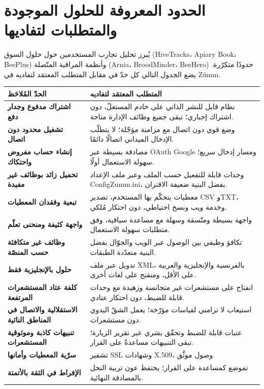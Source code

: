 \section{الحدود المعروفة للحلول الموجودة والمتطلبات لتفاديها}
يُبرز تحليل تجارب المستخدمين حول حلول السوق (\textenglish{HiveTracks}،
\textenglish{Apiary Book}، \textenglish{BeePlus}) وأنظمة المراقبة المتّصلة
(\textenglish{Arnia}، \textenglish{BroodMinder}، \textenglish{BeeHero}) حدودًا
متكرّرة. يضع الجدول التالي كل حدّ في مقابل المتطلب المعتمَد لتفاديه في Zümm.
\begin{xltabular}{\textwidth}{>{\bfseries}p{5.2cm} X}
\toprule
\textbf{الحدّ المُلاحَظ} & \textbf{المتطلب المعتمَد لتفاديه} \\
\midrule
\endhead
اشتراك مدفوع وجدار دفع & نظام قابل للنشر الذاتي على خادم المستغلّ، دون اشتراك إجباري؛ تبقى جميع وظائف الإدارة متاحة. \\
تشغيل محدود دون اتصال & وضع قوي دون اتصال مع مزامنة مؤجّلة؛ لا يتطلّب الإدخال الميداني اتصالًا دائمًا. \\
إنشاء حساب مفروض واحتكاك & مصادقة بسيطة عبر OAuth Google ومسار إدخال سريع؛ سهولة الاستعمال أولًا. \\
تحميل زائد بوظائف غير مفيدة & وحدات قابلة للتفعيل حسب الملف وعبر ملف الإعداد ConfigZumm.ini، بفضل البنية ضعيفة الاقتران. \\
تبعية وفقدان المعطيات & معطيات يتحكّم بها المستخدم، تصدير CSV وTXT، وخدمة ويب ونسخ احتياطي، دون احتكار مُلكي. \\
واجهة كثيفة ومنحنى تعلّم & واجهة بسيطة ومتّسقة وسهلة مع مساعدة سياقية، وفق متطلبات سهولة الاستعمال. \\
وظائف غير متكافئة حسب المنصّة & تكافؤ وظيفي بين الوصول عبر الويب والجوّال بفضل البنية متعدّدة الطبقات. \\
حلول بالإنجليزية فقط & تدويل عبر ملف XML، بالفرنسية والإنجليزية والعربية على الأقل، ومنفتح على لغات أخرى. \\
كلفة عتاد المستشعرات المرتفعة & انفتاح على مستشعرات غير متجانسة وزهيدة مع وحدات قابلة للضبط، دون احتكار عتادي. \\
الاستقلالية والاتصال في المناطق النائية & استيعاب لا تزامني لقياسات مؤرّخة؛ يعمل الشقّ اليدوي دون مستشعرات. \\
تنبيهات كاذبة وموثوقية المستشعرات & عتبات قابلة للضبط وتحقّق بشري عبر تقرير الزيارة؛ تبقى التنبيهات مساعدةً على القرار. \\
سرّية المعطيات وأمانها & تشفير SSL وشهادات X.509، وصول موثَّق. \\
الإفراط في الثقة بالأتمتة & تموضع كمساعدة على القرار؛ يحتفظ عون تربية النحل بالمصادقة النهائية. \\
\bottomrule
\end{xltabular}
